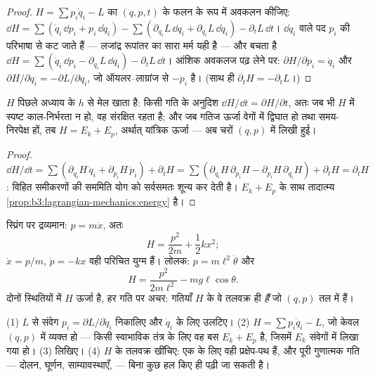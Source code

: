 \begin{proof}
$H = \sum p_i\dot q_i - L$ का $(q, p, t)$ के फलन के रूप में अवकलन कीजिए:
$\dd H = \sum(\dot q_i\,\dd p_i + p_i\,\dd\dot q_i) - \sum(
\partial_{q_i}L\,\dd q_i + \partial_{\dot q_i}L\,\dd\dot q_i) -
\partial_tL\,\dd t$। $\dd\dot q_i$ वाले पद
$p_i$ की परिभाषा से कट जाते हैं --- लजांद्र रूपांतर का सारा मर्म यही
है --- और बचता है
$\dd H = \sum(\dot q_i\,\dd p_i - \partial_{q_i}L\,\dd q_i) -
\partial_tL\,\dd t$। आंशिक अवकलज पढ़ लेने पर:
$\partial H/\partial p_i = \dot q_i$ और $\partial H/\partial q_i =
-\partial L/\partial q_i$, जो ऑयलर--लाग्रांज से $-\dot p_i$ है।
(साथ ही $\partial_tH = -\partial_tL$।)
\end{proof}

\begin{proposition}[$H$ है क्या]\label{prop:b3:hamiltonian-mechanics:energy}
$H$ पिछले अध्याय के  $h$ से मेल खाता है:
किसी गति के अनुदिश $\dd H/\dd t = \partial H/\partial t$, अतः जब भी
$H$ में स्पष्ट काल-निर्भरता न हो, वह संरक्षित रहता है; और जब गतिज ऊर्जा
वेगों में द्विघात हो तथा  समय-निरपेक्ष हों, तब
$H = E_k + E_p$, अर्थात् यांत्रिक ऊर्जा --- अब चरों $(q, p)$ में लिखी
हुई।
\end{proposition}

\begin{proof}
$\dd H/\dd t = \sum(\partial_{q_i}H\,\dot q_i + \partial_{p_i}H\,\dot
p_i) + \partial_tH = \sum(\partial_{q_i}H\,\partial_{p_i}H -
\partial_{p_i}H\,\partial_{q_i}H) + \partial_tH = \partial_tH$:
विहित समीकरणों की सममिति योग को सर्वसमतः शून्य कर देती है।
$E_k + E_p$ के साथ तादात्म्य
\cref{prop:b3:lagrangian-mechanics:energy} है।
\end{proof}

\begin{example}[दो हैमिल्टोनियन]\label{ex:b3:hamiltonian-mechanics:examples}
स्प्रिंग पर द्रव्यमान: $p = m\dot x$, अतः
\[
H = \frac{p^2}{2m} + \frac12 kx^2 ;
\]
 $\dot x = p/m$, $\dot p = -kx$ वही परिचित
युग्म हैं। लोलक: $p = m\ell^2\dot\theta$ और
\[
H = \frac{p^2}{2m\ell^2} - mg\ell\cos\theta .
\]
दोनों स्थितियों में $H$ ऊर्जा है, हर गति पर अचर: गतियाँ $H$ के वे
तलवक्र ही \emph{हैं} जो $(q,p)$ तल में हैं।
\end{example}

\begin{method}[हैमिल्टोनियन विधि]\label{met:b3:hamiltonian-mechanics:recipe}
(1) $L$ से संवेग $p_i = \partial L/\partial\dot q_i$ निकालिए
और $\dot q_i$ के लिए उलटिए। (2) $H = \sum p_i\dot q_i - L$, जो केवल
$(q, p)$ में व्यक्त हो --- किसी स्वाभाविक तंत्र के लिए वह बस $E_k + E_p$
है, जिसमें $E_k$ संवेगों में लिखा गया हो। (3)  लिखिए। (4) $H$ के तलवक्र खींचिए: एक  के लिए वही
प्रक्षेप-पथ हैं, और पूरी गुणात्मक गति --- दोलन, घूर्णन, साम्यावस्थाएँ,
 --- बिना कुछ हल किए ही पढ़ी जा सकती है।
\end{method}

